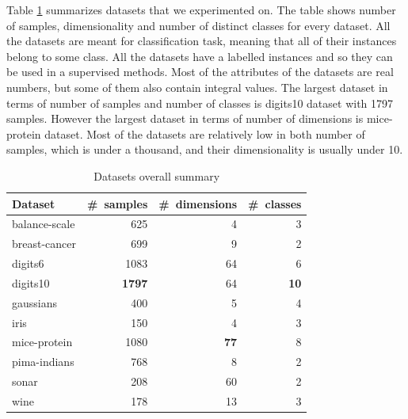 \documentclass[12pt,a4paper]{report}
\begin{document}
Table \ref{tab:datasets} summarizes datasets that we experimented on. The table shows number of samples, dimensionality and number of distinct classes for every dataset. All the datasets are meant for classification task, meaning that all of their instances belong to some class. All the datasets have a labelled instances and so they can be used in a supervised methods. Most of the attributes of the datasets are real numbers, but some of them also contain integral values. The largest dataset in terms of number of samples and number of classes is digits10 dataset with 1797 samples. However the largest dataset in terms of number of dimensions is mice-protein dataset. Most of the datasets are relatively low in both number of samples, which is under a thousand, and their dimensionality is usually under 10.

\begin{table}[ht] \centering
\begin{tabular}{lrrr}
\hline
Dataset & \#~samples & \#~dimensions & \#~classes \\
\hline
balance-scale           & 625   & 4    & 3  \\
breast-cancer           & 699   & 9    & 2  \\
digits6                 & 1083  & 64   & 6  \\
digits10                & \textbf{1797}  & 64  & \textbf{10} \\
gaussians               & 400   & 5   & 4  \\
iris                    & 150   & 4    & 3  \\
mice-protein            & 1080  & \textbf{77}   & 8  \\
pima-indians            & 768   & 8    & 2  \\
sonar                   & 208   & 60   & 2  \\
wine                    & 178   & 13   & 3  \\
\hline
\end{tabular}
\caption{Datasets overall summary} \label{tab:datasets}
\end{table}
\end{document}
